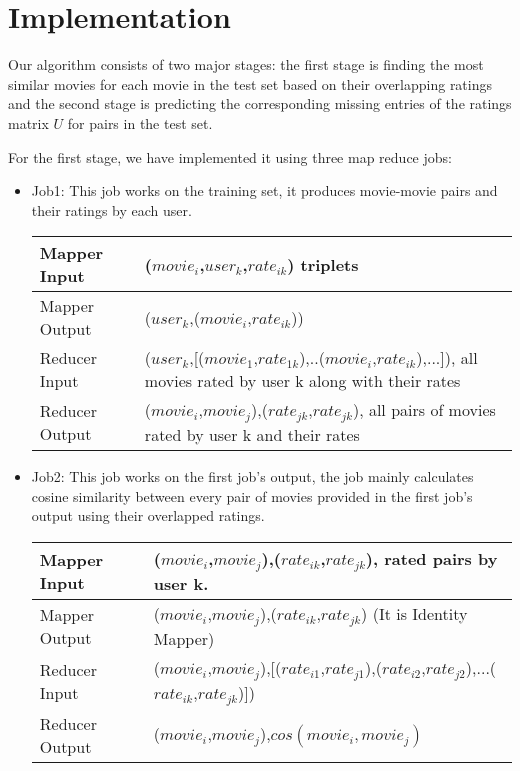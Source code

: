 \section{Implementation}
Our algorithm consists of two major stages: the first stage is finding
the most similar movies for each movie in the test set based on their
overlapping ratings and the second stage is predicting the
corresponding missing entries of the ratings matrix $U$ for pairs in
the test set.

For the first stage, we have implemented it using three map reduce
jobs:\\
\begin{itemize}
\item Job1: This job works on the training set, it produces
  movie-movie pairs and their ratings by each user.

  \begin{tabular}{|l|p{10cm}|}
      \hline
      Mapper Input & ($movie_i$,$user_k$,$rate_{ik}$) triplets\\
      \hline
      Mapper Output & ($user_k$,($movie_i$,$rate_{ik}$))\\
      \hline
      Reducer Input & ($user_k$,[($movie_1$,$rate_{1k}$),..($movie_i$,$rate_{ik}$),...]), all movies rated by user k along with their rates\\
      \hline
      Reducer Output & ($movie_i$,$movie_j$),($rate_{jk}$,$rate_{jk}$), all pairs of movies rated by user k and their rates\\
      \hline
  \end{tabular}
  
\item Job2: This job works on the first job's output, the job mainly
  calculates cosine similarity between every pair of movies provided
  in the first job's output using their overlapped ratings.

  \begin{tabular}{|l|p{10cm}|}
    \hline
    Mapper Input & ($movie_i$,$movie_j$),($rate_{ik}$,$rate_{jk}$), rated pairs by user k.\\
    \hline
    Mapper Output & ($movie_i$,$movie_j$),($rate_{ik}$,$rate_{jk}$) (It is Identity Mapper)\\
    \hline
    Reducer Input & ($movie_i$,$movie_j$),[($rate_{i1}$,$rate_{j1}$),($rate_{i2}$,$rate_{j2}$),...($rate_{ik}$,$rate_{jk}$)])\\
    \hline
    Reducer Output & ($movie_i$,$movie_j$),$cos(movie_i,movie_j)$\\
    \hline
  \end{tabular}
  

\end{itemize}
